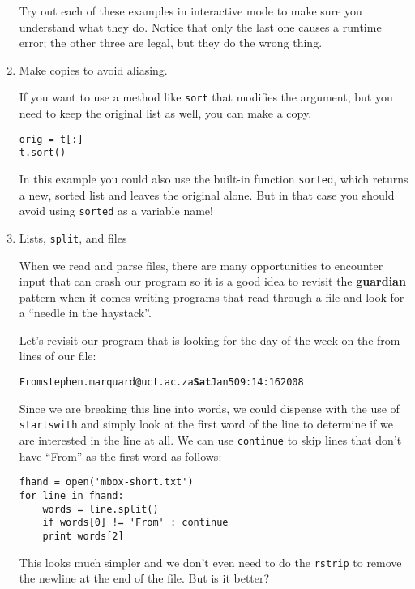 \begin{enumerate}
Try out each of these examples in interactive mode to make sure
you understand what they do.  Notice that only the last
one causes a runtime error; the other three are legal, but they
do the wrong thing.


\item Make copies to avoid aliasing.


If you want to use a method like {\tt sort} that modifies
the argument, but you need to keep the original list as
well, you can make a copy.

\beforeverb
\begin{verbatim}
orig = t[:]
t.sort()
\end{verbatim}
\afterverb

In this example you could also use the built-in function {\tt sorted},
which returns a new, sorted list and leaves the original alone.
But in that case you should avoid using {\tt sorted} as a variable
name!

\item Lists, {\tt split}, and files

When we read and parse files, there are many opportunities
to encounter input that can crash our program so it is a good 
idea to revisit the {\bf guardian} pattern when it comes
writing programs that read through a file 
and look for a ``needle in the haystack''.

Let's revisit our program that is looking for the day of the
week on the from lines of our file:

\beforeverb
\begin{alltt}
From stephen.marquard@uct.ac.za {\bf Sat} Jan  5 09:14:16 2008
\end{alltt}
\afterverb

Since we are breaking this line into words, we could dispense
with the use of {\tt startswith} and simply look at the 
first word of the line to determine if we are interested
in the line at all.  We can use {\tt continue} to skip lines
that don't have ``From'' as the first word as follows:

\beforeverb
\begin{verbatim}
fhand = open('mbox-short.txt')
for line in fhand:
    words = line.split()
    if words[0] != 'From' : continue
    print words[2]
\end{verbatim}
\afterverb
%
This looks much simpler and we don't even need to do the 
{\tt rstrip} to remove the newline at the end of the file.
But is it better?


\end{enumerate}
